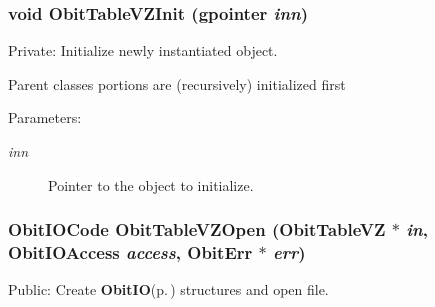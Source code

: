 \subsubsection{\setlength{\rightskip}{0pt plus 5cm}void Obit\-Table\-VZInit (gpointer {\em inn})}\label{ObitTableVZ_8c_a8}


Private: Initialize newly instantiated object. 

Parent classes portions are (recursively) initialized first \begin{Desc}
\item[Parameters:]
\begin{description}
\item[{\em inn}]Pointer to the object to initialize. \end{description}
\end{Desc}
\subsubsection{\setlength{\rightskip}{0pt plus 5cm}Obit\-IOCode Obit\-Table\-VZOpen ({\bf Obit\-Table\-VZ} $\ast$ {\em in}, Obit\-IOAccess {\em access}, {\bf Obit\-Err} $\ast$ {\em err})}\label{ObitTableVZ_8c_a21}


Public: Create {\bf Obit\-IO}{\rm (p.\,\pageref{structObitIO})} structures and open file. 

